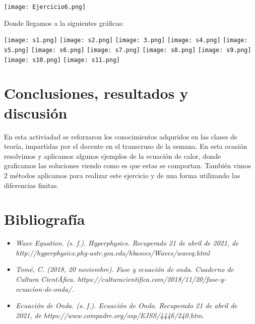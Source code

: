 \documentclass[12pt]{article}
\begin{document}
\begin{center}
    \texttt{[image: Ejercicio6.png]}
    
    Donde llegamos a la siguientes gráficas:
    
    \texttt{[image: s1.png]}
    \texttt{[image: s2.png]}
    \texttt{[image: 3.png]}
    \texttt{[image: s4.png]}
    \texttt{[image: s5.png]}
    \texttt{[image: s6.png]}
    \texttt{[image: s7.png]}
    \texttt{[image: s8.png]}
    \texttt{[image: s9.png]}
    \texttt{[image: s10.png]}
    \texttt{[image: s11.png]}

    
\end{center}
\newpage

\section*{Conclusiones, resultados y discusión}
En esta activiadad se reforzaron los conocimientos adquridos en las clases de teoría, impartidas por el docente en el transcruso de la semana. En esta ocasión resolvimos y aplicamos algunos ejemplos de la ecuación de calor, donde graficamos las soluciones viendo como es que estas se comportan. También vimos 2 métodos aplicamos para realizar este ejercicio y de una forma utilizando las diferencias finitas.





\section*{Bibliografía}
\begin{itemize}

\item \textit{Wave Equation. (s. f.). Hyperphysics. Recuperado 21 de abril de 2021, de http://hyperphysics.phy-astr.gsu.edu/hbasees/Waves/waveq.html}

\item \textit{Tomé, C. (2018, 20 noviembre). Fase y ecuación de onda. Cuaderno de Cultura CientÃ­fica. https://culturacientifica.com/2018/11/20/fase-y-ecuacion-de-onda/.}

\item \textit{Ecuación de Onda. (s. f.). Ecuación de Onda. Recuperado 21 de abril de 2021, de https://www.compadre.org/osp/EJSS/4446/240.htm.}

\end{itemize}


\end{document}
